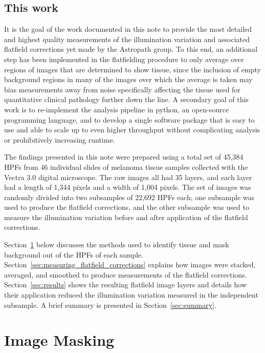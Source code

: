 \documentclass[letterpaper,11pt]{article}
\newcommand{\refsec}[1]{Section~\ref{#1}}
\begin{document}
\subsection{This work}
\label{ssec:this_work}

It is the goal of the work documented in this note to provide the most detailed and highest quality measurements of the illumination variation and associated flatfield corrections yet made by the Astropath group. To this end, an additional step has been implemented in the flatfielding procedure to only average over regions of images that are determined to show tissue, since the inclusion of empty background regions in many of the images over which the average is taken may bias measurements away from noise specifically affecting the tissue used for quantitative clinical pathology further down the line. A secondary goal of this work is to re-implement the analysis pipeline in python, an open-source programming language, and to develop a single software package that is easy to use and able to scale up to even higher throughput without complicating analysis or prohibitively increasing runtime.

The findings presented in this note were prepared using a total set of 45,384 HPFs from 46 individual slides of melanoma tissue samples collected with the Vectra 3.0 digital microscope. The raw images all had 35 layers, and each layer had a length of 1,344 pixels and a width of 1,004 pixels. The set of images was randomly divided into two subsamples of 22,692 HPFs each; one subsample was used to produce the flatfield corrections, and the other subsample was used to measure the illumination variation before and after application of the flatfield corrections.

\refsec{sec:image_masking} below discusses the methods used to identify tissue and mask background out of the HPFs of each sample. \refsec{sec:measuring_flatfield_corrections} explains how images were stacked, averaged, and smoothed to produce measurements of the flatfield corrections. \refsec{sec:results} shows the resulting flatfield image layers and details how their application reduced the illumination variation measured in the independent subsample. A brief summary is presented in \refsec{sec:summary}.

\section{Image Masking}
\label{sec:image_masking}
\end{document}
